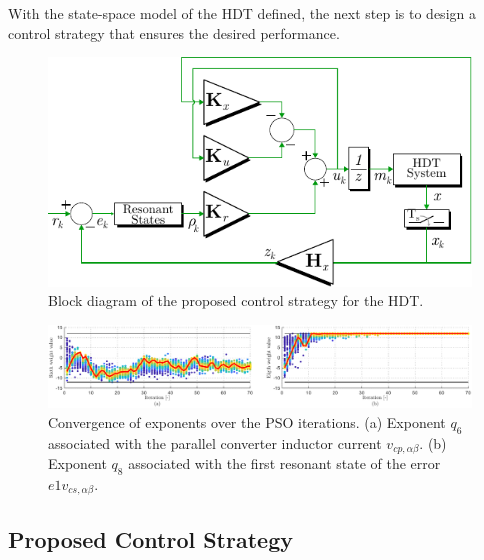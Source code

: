With the state-space model of the HDT defined, the next step is to design a control strategy that ensures the desired performance. 

\begin{figure}[t!]
    \centering
    \includegraphics[width=\columnwidth]{Images/Control_Diagram.pdf} 
    \caption{Block diagram of the proposed control strategy for the HDT.}
    \label{fig:Control_Diagram}
\end{figure}

\begin{figure}[t!]
    \centering
    \includegraphics[width = \textwidth]{Images/w6_w8_iterations.pdf}
    \caption{Convergence of exponents over the PSO iterations. (a) Exponent $q_6$ associated with the parallel converter inductor current $v_{cp,\alpha\beta}$. (b) Exponent $q_8$ associated with the first resonant state of the error $e1v_{cs,\alpha\beta}$.}
    \label{fig:PSO_Convergence}
\end{figure}

\subsection{Proposed Control Strategy}

